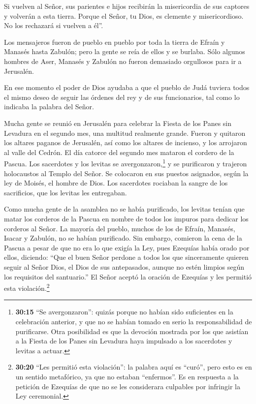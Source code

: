  Si vuelven al Señor, sus parientes e hijos recibirán la
misericordia de sus captores y volverán a esta tierra. Porque el Señor,
tu Dios, es clemente y misericordioso. No los rechazará si vuelven a
él''.

 Los mensajeros fueron de pueblo en pueblo por toda la
tierra de Efraín y Manasés hasta Zabulón; pero la gente se reía de ellos
y se burlaba.  Sólo algunos hombres de Aser, Manasés y
Zabulón no fueron demasiado orgullosos para ir a Jerusalén.

 En ese momento el poder de Dios ayudaba a que el pueblo de
Judá tuviera todos el mismo deseo de seguir las órdenes del rey y de sus
funcionarios, tal como lo indicaba la palabra del Señor.

 Mucha gente se reunió en Jerusalén para celebrar la Fiesta
de los Panes sin Levadura en el segundo mes, una multitud realmente
grande.  Fueron y quitaron los altares paganos de
Jerusalén, así como los altares de incienso, y los arrojaron al valle
del Cedrón.  El día catorce del segundo mes mataron el
cordero de la Pascua. Los sacerdotes y los levitas se
avergonzaron,\footnote{\textbf{30:15} ``Se avergonzaron'': quizás porque
  no habían sido suficientes en la celebración anterior, y que no se
  habían tomado en serio la responsabilidad de purificarse. Otra
  posibilidad es que la devoción mostrada por los que asistían a la
  Fiesta de los Panes sin Levadura haya impulsado a los sacerdotes y
  levitas a actuar.} y se purificaron y trajeron holocaustos al Templo
del Señor.  Se colocaron en sus puestos asignados, según la
ley de Moisés, el hombre de Dios. Los sacerdotes rociaban la sangre de
los sacrificios, que los levitas les entregaban.

 Como mucha gente de la asamblea no se había purificado,
los levitas tenían que matar los corderos de la Pascua en nombre de
todos los impuros para dedicar los corderos al Señor.  La
mayoría del pueblo, muchos de los de Efraín, Manasés, Isacar y Zabulón,
no se habían purificado. Sin embargo, comieron la cena de la Pascua a
pesar de que no era lo que exigía la Ley, pues Ezequías había orado por
ellos, diciendo: ``Que el buen Señor perdone a todos los 
que sinceramente quieren seguir al Señor Dios, el Dios de sus
antepasados, aunque no estén limpios según los requisitos del
santuario.''  El Señor aceptó la oración de Ezequías y les
permitió esta violación.\footnote{\textbf{30:20} ``Les permitió esta
  violación'': la palabra aquí es ``curó'', pero esto es en un sentido
  metafórico, ya que no estaban ``enfermos''. Es en respuesta a la
  petición de Ezequías de que no se les considerara culpables por
  infringir la Ley ceremonial.}

